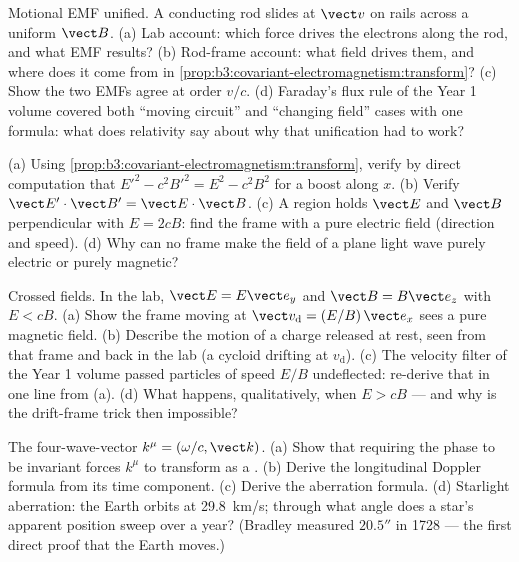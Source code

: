\begin{exercise}[$\star\star$]\label{exo:b3:covariant-electromagnetism:5}
Motional EMF unified. A conducting rod slides at $\vect v$ on rails
across a uniform $\vect B$. (a) Lab account: which force drives the
electrons along the rod, and what EMF results? (b) Rod-frame account:
what field drives them, and where does it come from in
\cref{prop:b3:covariant-electromagnetism:transform}? (c) Show the two
EMFs agree at order $v/c$. (d) Faraday's flux rule of the Year 1
volume covered both ``moving circuit'' and ``changing field'' cases
with one formula: what does relativity say about why that unification
had to work?
\end{exercise}

\begin{exercise}[$\star\star$]\label{exo:b3:covariant-electromagnetism:6}
(a) Using \cref{prop:b3:covariant-electromagnetism:transform}, verify
by direct computation that $E'^2 - c^2B'^2 = E^2 - c^2B^2$ for a
boost along $x$. (b) Verify $\vect E'\cdot\vect B' = \vect
E\cdot\vect B$. (c) A region holds $\vect E$ and $\vect B$
perpendicular with $E = 2cB$: find the frame with a pure electric
field (direction and speed). (d) Why can no frame make the field of
a plane light wave purely electric or purely magnetic?
\end{exercise}

\begin{exercise}[$\star\star$]\label{exo:b3:covariant-electromagnetism:7}
Crossed fields. In the lab, $\vect E = E\vect e_y$ and $\vect B =
B\vect e_z$ with $E < cB$. (a) Show the frame moving at
$\vect v_{\text{d}} = (E/B)\,\vect e_x$ sees a pure magnetic field.
(b) Describe the motion of a charge released at rest, seen from that
frame and back in the lab (a cycloid drifting at $v_{\text{d}}$). (c)
The velocity filter of the Year 1 volume passed particles of speed
$E/B$ undeflected: re-derive that in one line from (a). (d) What
happens, qualitatively, when $E > cB$ --- and why is the drift-frame
trick then impossible?
\end{exercise}

\begin{exercise}[$\star\star$]\label{exo:b3:covariant-electromagnetism:8}
The four-wave-vector $k^\mu = (\omega/c, \vect k)$. (a) Show that
requiring the phase to be invariant forces $k^\mu$ to transform as a
. (b) Derive the longitudinal Doppler formula from its
time component. (c) Derive the aberration formula. (d) Starlight
aberration: the Earth orbits at \qty{29.8}{km/s}; through what angle
does a star's apparent position sweep over a year? (Bradley measured
$20.5''$ in 1728 --- the first direct proof that the Earth moves.)
\end{exercise}

